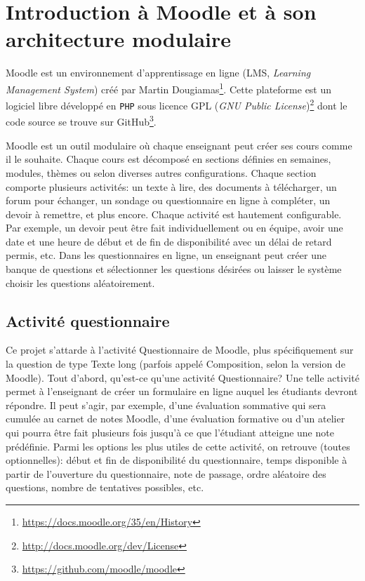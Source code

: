 \chapter{Introduction \`a Moodle et \`a son architecture modulaire}
Moodle est un environnement d'apprentissage en ligne (LMS, \textit{Learning Management System}) cr\'e\'e par Martin Dougiamas\footnote{\url{https://docs.moodle.org/35/en/History}}.
Cette plateforme est un logiciel libre d\'evelopp\'e en \texttt{PHP} sous licence GPL (\textit{GNU Public License})\footnote{\url{http://docs.moodle.org/dev/License}} dont le code source se trouve sur GitHub\footnote{\url{https://github.com/moodle/moodle}}.

Moodle est un outil modulaire o\`u chaque enseignant peut cr\'eer ses cours comme il le souhaite.
Chaque cours est d\'ecompos\'e en sections d\'efinies en semaines, modules, th\`emes ou selon diverses autres configurations.
Chaque section comporte plusieurs activit\'es: un texte \`a lire, des documents \`a t\'el\'echarger, un forum pour \'echanger, un sondage ou questionnaire en ligne \`a compl\'eter, un devoir \`a remettre, et plus encore.
Chaque activit\'e est hautement configurable.
Par exemple, un devoir peut \^etre fait individuellement ou en \'equipe, avoir une date et une heure de d\'ebut et de fin de disponibilit\'e avec un d\'elai de retard permis, etc.
Dans les questionnaires en ligne, un enseignant peut cr\'eer une banque de questions et s\'electionner les questions d\'esir\'ees ou laisser le syst\`eme choisir les questions al\'eatoirement.

\section{Activit\'e questionnaire}
Ce projet s'attarde \`a l'activit\'e Questionnaire de Moodle, plus sp\'ecifiquement sur la question de type Texte long (parfois appel\'e Composition, selon la version de Moodle).
Tout d'abord, qu'est-ce qu'une activit\'e Questionnaire?
Une telle activit\'e permet \`a l'enseignant de cr\'eer un formulaire en ligne auquel les \'etudiants devront r\'epondre.
Il peut s'agir, par exemple, d'une \'evaluation sommative qui sera cumul\'ee au carnet de notes Moodle, d'une \'evaluation formative ou d'un atelier qui pourra \^etre fait plusieurs fois jusqu'\`a ce que l'\'etudiant atteigne une note pr\'ed\'efinie.
Parmi les options les plus utiles de cette activit\'e, on retrouve (toutes optionnelles): d\'ebut et fin de disponibilit\'e du questionnaire, temps disponible \`a partir de l'ouverture du questionnaire, note de passage, ordre al\'eatoire des questions, nombre de tentatives possibles, etc.

